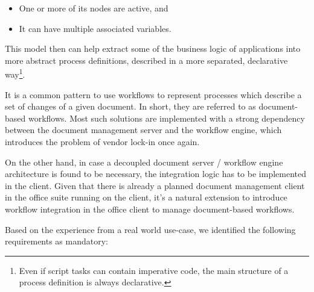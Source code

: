\begin{itemize}
\item One or more of its nodes are active, and
\item It can have multiple associated variables.
\end{itemize}

This model then can help extract some of the business logic of applications
into more abstract process definitions, described in a more separated,
declarative way\footnote{Even if script tasks can contain imperative code, the
main structure of a process definition is always declarative.}.

It is a common pattern to use workflows to represent processes which describe a
set of changes of a given document. In short, they are referred to as
document-based workflows. Most such solutions are implemented with a strong
dependency between the document management server and the workflow engine,
which introduces the problem of vendor lock-in once again.

On the other hand, in case a decoupled document server / workflow engine
architecture is found to be necessary, the integration logic has to be implemented
in the client. Given that there is already a planned document management client
in the office suite running on the client, it's a natural extension to
introduce workflow integration in the office client to manage document-based
workflows.

Based on the experience from a real world use-case, we identified the following
requirements as mandatory:

